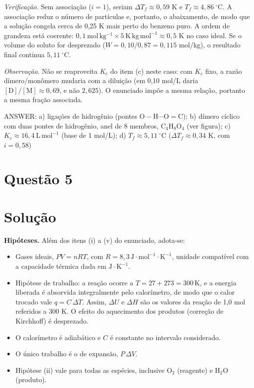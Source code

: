 \documentclass{article}%
\begin{document}
\textit{Verificação.} Sem associação ($i=1$), seriam $\Delta T_f\approx0{,}59$ K e $T_f\approx4{,}86\ ^\circ\mathrm{C}$. A associação reduz o número de partículas e, portanto, o abaixamento, de modo que a solução congela cerca de 0,25 K mais perto do benzeno puro. A ordem de grandeza está coerente: $0{,}1\ \mathrm{mol\,kg^{-1}}\times5\ \mathrm{K\,kg\,mol^{-1}}\approx0{,}5$ K no caso ideal. Se o volume do soluto for desprezado ($W=0{,}10/0{,}87=0{,}115$ mol/kg), o resultado final continua $5{,}11\ ^\circ\mathrm{C}$.

\textit{Observação.} Não se reaproveita $K_c$ do item (c) neste caso: com $K_c$ fixo, a razão dímero/monômero mudaria com a diluição (em 0,10 mol/L daria $[\mathrm{D}]/[\mathrm{M}]\approx0{,}69$, e não $2{,}625$). O enunciado impõe a mesma relação, portanto a mesma fração associada.

ANSWER: a) ligações de hidrogênio (pontes $\mathrm{O{-}H\cdots O{=}C}$); b) dímero cíclico com duas pontes de hidrogênio, anel de 8 membros, $\mathrm{C_4H_8O_4}$ (ver figura); c) $K_c\approx16{,}4\ \mathrm{L\,mol^{-1}}$ (base de 1 mol/L); d) $T_f\approx5{,}11\ ^\circ\mathrm{C}$ ($\Delta T_f\approx0{,}34$ K, com $i=0{,}58$)%
\newpage%
\section*{Questão 5}

\section*{Solução}

\textbf{Hipóteses.} Além dos itens (i) a (v) do enunciado, adota-se:
\begin{itemize}
\item[(a)] Gases ideais, $PV=nRT$, com $R=8{,}3\,\text{J}\cdot\text{mol}^{-1}\cdot\text{K}^{-1}$, unidade compatível com a capacidade térmica dada em $\text{J}\cdot\text{K}^{-1}$.
\item[(b)] Hipótese de trabalho: a reação ocorre a $T=27+273=300\,\text{K}$, e a energia liberada é absorvida integralmente pelo calorímetro, de modo que o calor trocado vale $q=C\,\Delta T$. Assim, $\Delta U$ e $\Delta H$ são os valores da reação de 1,0 mol referidos a 300 K. O efeito do aquecimento dos produtos (correção de Kirchhoff) é desprezado.
\item[(c)] O calorímetro é adiabático e $C$ é constante no intervalo considerado.
\item[(d)] O único trabalho é o de expansão, $P\,\Delta V$.
\item[(e)] Hipótese (ii) vale para todas as espécies, inclusive $\text{O}_2$ (reagente) e $\text{H}_2\text{O}$ (produto).
\end{itemize}
\end{document}
